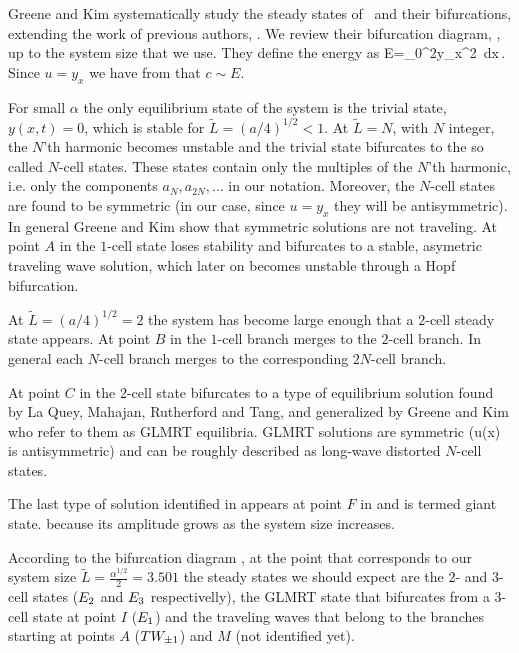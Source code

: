 {Greene and Kim systematically study the steady states of \KSe\ and their bifurcations, extending the work of
previous authors, . We review their bifurcation diagram, , up to
the system size that we use. They define the energy as
\beq
	E=\int_0^{2\pi}y_x^2\, dx\,.
\eeq
Since $u=y_x$ we have from  that $c\sim E$. 

For small $\alpha$ the only equilibrium state of the system is the trivial state, $y(x,t)=0$, which is
stable for $\tilde{L}=(a/4)^{1/2}<1$. At $\tilde{L}=N$, with $N$ integer, the $N$'th harmonic becomes unstable and
the trivial state bifurcates to the so called $N$-cell states. These states contain only the multiples of the $N$'th
harmonic, i.e. only the components $a_N,a_{2N},...$ in our notation. 
Moreover, the $N$-cell states are found to be symmetric (in our case, since $u=y_x$ they will be
antisymmetric). In general Greene and Kim show that symmetric solutions are not traveling. 
At point $A$ in  the $1$-cell state loses stability and bifurcates to a stable, 
asymetric traveling wave solution, which later on becomes unstable through a Hopf bifurcation. 

At $\tilde{L}=(a/4)^{1/2}=2$ the system has become large enough that a $2$-cell steady state appears. At point $B$
in  the $1$-cell branch merges to the $2$-cell branch. In general each $N$-cell branch merges to the corresponding $2N$-cell branch.

At point $C$ in  the $2$-cell state bifurcates to a type of equilibrium solution
found by La Quey, Mahajan, Rutherford and Tang,  and generalized by Greene and Kim who refer to them as GLMRT equilibria. GLMRT solutions are symmetric (u(x) is antisymmetric) and can be roughly described as long-wave distorted $N$-cell states.

The last type of solution identified in  appears at point $F$ in  and is termed
giant state. because its amplitude grows as the system size increases.

According to the bifurcation diagram , at the point that corresponds to our system size $\tilde{L}=\frac{\alpha^{1/2}}{2}=3.501$ the steady states we should expect are the $2$- and $3$-cell states ($E_{2}$ and $E_{3}$ respectivelly), the GLMRT state that bifurcates from a $3$-cell state at point $I$ ($E_{1}$) and the traveling waves that belong to the branches starting at points $A$ ($TW_{\pm1}$) and $M$ (not identified yet).
 
        }%
